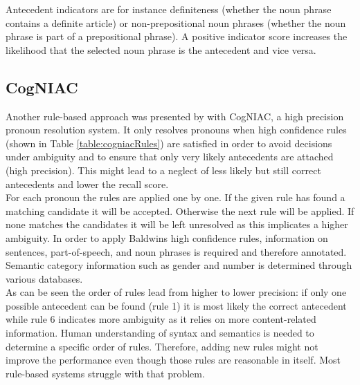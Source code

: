 Antecedent indicators are for instance definiteness (whether the noun phrase contains a definite article) or non-prepositional noun phrases (whether the noun phrase is part of a prepositional phrase). A positive indicator score increases the likelihood that the selected noun phrase is the antecedent and vice versa.


\subsection{CogNIAC}
Another rule-based approach was presented by \citep{baldwin1997cogniac} with CogNIAC, a high precision pronoun resolution system. It only resolves pronouns when high confidence rules (shown in Table \ref{table:cogniacRules})  are satisfied in order to avoid decisions under ambiguity and to ensure that only very likely antecedents are attached (high precision). This might lead to a neglect of less likely but still correct antecedents and lower the recall score. 
\\
For each pronoun the rules are applied one by one. If the given rule has found a matching candidate it will be accepted. Otherwise the next rule will be applied. If none matches the candidates it will be left unresolved as this implicates a higher ambiguity. In order to apply Baldwins high confidence rules, information on sentences, part-of-speech, and noun phrases is required and therefore annotated.  Semantic category information such as gender and number is determined through various databases. \\
As can be seen the order of rules lead from higher to lower precision: if only one possible antecedent can be found (rule 1) it is most likely the correct antecedent while rule 6 indicates more ambiguity as it relies on more content-related information. Human understanding of syntax and semantics is needed to determine a specific order of rules. Therefore, adding new rules might not improve the performance even though those rules are reasonable in itself. Most rule-based systems struggle with that problem.
